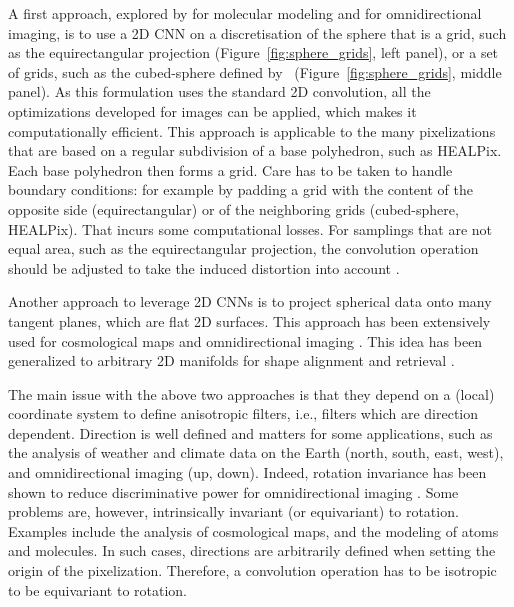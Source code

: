 \documentclass[final,twocolumn,3p,times,sort&compress]{elsarticle}
\newcommand{\figref}[1]{Figure~\ref{fig:#1}}
\newcommand{\1}{\b{1}}              %
\newcommand{\0}{\b{0}}              %
\begin{document}
A first approach, explored by \citep{boomsma2017spherical} for molecular modeling and \citep{su2017sphericalconv, coors2018spherenet} for omnidirectional imaging, is to use a 2D CNN on a discretisation of the sphere that is a grid, such as the equirectangular projection (\figref{sphere_grids}, left panel), or a set of grids, such as the cubed-sphere defined by~\citep{ronchi1996cubed} (\figref{sphere_grids},  middle panel).
As this formulation uses the standard 2D convolution, all the optimizations developed for images can be applied, which makes it computationally efficient.
This approach is applicable to the many pixelizations that are based on a regular subdivision of a base polyhedron, such as HEALPix. Each base polyhedron then forms a grid.
Care has to be taken to handle boundary conditions: for example by padding a grid with the content of the opposite side (equirectangular) or of the neighboring grids (cubed-sphere, HEALPix). That incurs some computational losses.
For samplings that are not equal area, such as the equirectangular projection, the convolution operation should be adjusted to take the induced distortion into account \citep{su2017sphericalconv, coors2018spherenet}.

Another approach to leverage 2D CNNs is to project spherical data onto many tangent planes, which are flat 2D surfaces.
This approach has been extensively used for cosmological maps \citep{fluri2018deep, gupta2018nongaussianinformation, schmelze2017cosmologicalmodel, gillet2018deeplearning} and omnidirectional imaging \citep{xiao2012recognizing, zhang2014panocontext}.
This idea has been generalized to arbitrary 2D manifolds for shape alignment and retrieval \citep{masci2015gcnn, boscaini2016acnn, monti2017monet}.

The main issue with the above two approaches is that they depend on a (local) coordinate system to define anisotropic filters, i.e., filters which are direction dependent.
Direction is well defined and matters for some applications, such as the analysis of weather and climate data on the Earth (north, south, east, west), and omnidirectional imaging (up, down).
Indeed, rotation invariance has been shown to reduce discriminative power for omnidirectional imaging \citep{coors2018spherenet}.
Some problems are, however, intrinsically invariant (or equivariant) to rotation.
Examples include the analysis of cosmological maps, and the modeling of atoms and molecules.
In such cases, directions are arbitrarily defined when setting the origin of the pixelization.
Therefore, a convolution operation has to be isotropic to be equivariant to rotation.
\end{document}
